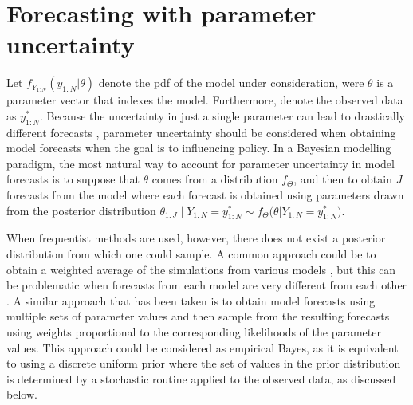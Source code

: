 \section{Forecasting with parameter uncertainty}

Let $f_{Y_{1:N}}(y_{1:N} | \theta)$ denote the pdf of the model under consideration, were $\theta$ is a parameter vector that indexes the model.
Furthermore, denote the observed data as $y_{1:N}^*$.
Because the uncertainty in just a single parameter can lead to drastically different forecasts \citep{saltelli20},
parameter uncertainty should be considered when obtaining model forecasts when the goal is to influencing policy.
In a Bayesian modelling paradigm, the most natural way to account for parameter uncertainty in model forecasts is to suppose that $\theta$ comes from a distribution $f_{\Theta}$, and then to obtain $J$ forecasts from the model where each forecast is obtained using parameters drawn from the posterior distribution $\theta_{1:J} \mid Y_{1:N} = y_{1:N}^* \sim f_{\Theta}\big(\theta | Y_{1:N} = y_{1:N}^*\big)$.

When frequentist methods are used, however, there does not exist a posterior distribution from which one could sample.
A common approach could be to obtain a weighted average of the simulations from various models \citep{hoeting99}, but this can be problematic when forecasts from each model are very different from each other \citep{grueber11}.
A similar approach that has been taken \citep{king15} is to obtain model forecasts using multiple sets of parameter values and then sample from the resulting forecasts using weights proportional to the corresponding likelihoods of the parameter values.
This approach could be considered as empirical Bayes, as it is equivalent to using a discrete uniform prior where the set of values in the prior distribution is determined by a stochastic routine applied to the observed data, as discussed below.

